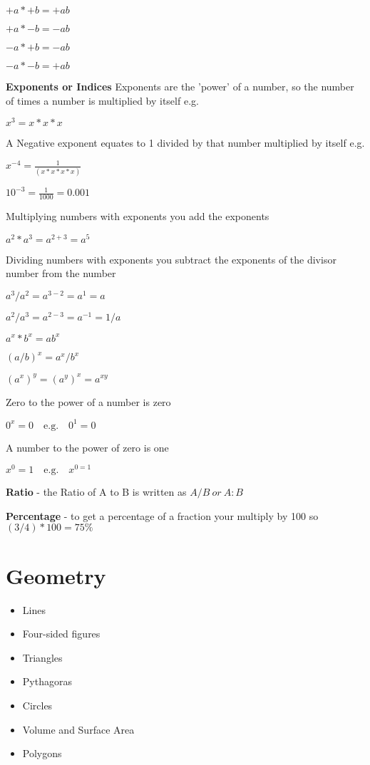 \documentclass{article}
\begin{document}
$+a * +b = +ab$

$+a * -b = -ab$

$-a * +b = -ab$

$-a * -b = +ab$

\textbf{Exponents or Indices}
Exponents are the 'power' of a number, so the number of times a number is multiplied by itself e.g.

$x^{3} = x * x * x$

A Negative exponent equates to 1 divided by that number multiplied by itself e.g.

$x^{-4} = \frac{1}{(x * x * x * x)}$

$ 10^{-3}  = \frac{1}{1000} = 0.001 $


Multiplying numbers with exponents you add the exponents 

$a^{2} * a^{3} = a^{2+3} = a^{5}$

Dividing numbers with exponents you subtract the exponents of the divisor number from the number 

$a^{3} / a^{2} = a^{3-2} = a^{1} = a$

$a^{2} / a^{3} = a^{2-3} = a^{-1} = 1/a$


$ a^{x} * b^{x} = ab^{x}$

$ (a/b)^{x} = a^{x} / b^{x} $

$ (a^{x})^{y} =  (a^{y})^{x}  = a^{xy}$


Zero to the power of a number is zero

$ 0^{x} = 0 \quad \textrm{e.g.} \quad  0^{1} = 0$

A number to the power of zero is one

$ x^{0} = 1 \quad \textrm{e.g.} \quad  x^{0 =1}$

\textbf{Ratio} - the Ratio of A to B is written as $ A/B \ or \ A : B$


\textbf{Percentage} - to get a percentage of a fraction your multiply by 100 so $ ( 3/4 ) * 100 = 75\%$

\newpage
\section{Geometry}

\begin{itemize}
\item Lines
\item Four-sided figures
\item Triangles
\item Pythagoras
\item Circles
\item Volume and Surface Area
\item Polygons
\end{itemize}
\end{document}
